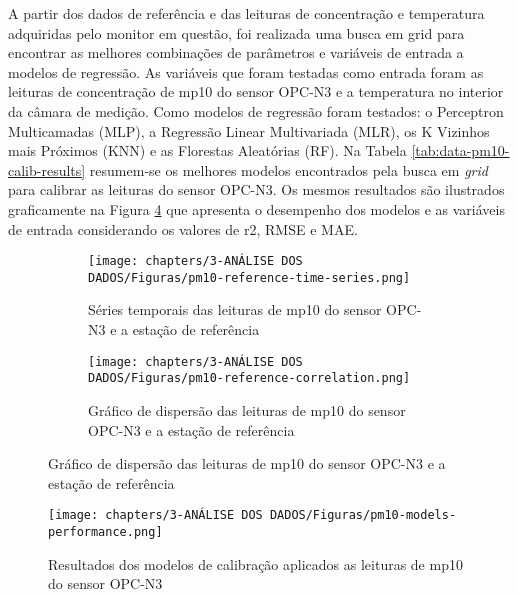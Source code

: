 A partir dos dados de referência e das leituras de concentração e temperatura adquiridas pelo monitor em questão, foi realizada uma busca em grid para encontrar as melhores combinações de parâmetros e variáveis de entrada a modelos de regressão. As variáveis que foram testadas como entrada foram as leituras de concentração de \acrshort{mp10} do sensor OPC-N3 e a temperatura no interior da câmara de medição. Como modelos de regressão foram testados: o Perceptron Multicamadas (MLP), a Regressão Linear Multivariada (MLR), os K Vizinhos mais Próximos (KNN) e as Florestas Aleatórias (RF). Na Tabela \ref{tab:data-pm10-calib-results} resumem-se os melhores modelos encontrados pela busca em \textit{grid} para calibrar as leituras do sensor OPC-N3. Os mesmos resultados são ilustrados graficamente na Figura \ref{fig:data-pm10-models-performance} que apresenta o desempenho dos modelos e as variáveis de entrada considerando os valores de r2, RMSE e MAE.

\begin{figure}[h]
    \centering
    \caption{Séries temporais e gráficos de dispersão das medições de \acrshort{mp10}}
    \begin{subfigure}{0.44\textwidth}
        \texttt{[image: chapters/3-ANÁLISE DOS DADOS/Figuras/pm10-reference-time-series.png]}
        \caption{Séries temporais das leituras de \acrshort{mp10} do sensor OPC-N3 e a estação de referência}
        \label{fig:data-pm10-reference-time-series}
    \end{subfigure}
    \hfill
    \begin{subfigure}{0.54\textwidth}
        \texttt{[image: chapters/3-ANÁLISE DOS DADOS/Figuras/pm10-reference-correlation.png]}
        \caption{Gráfico de dispersão das leituras de \acrshort{mp10} do sensor OPC-N3 e a estação de referência}
        \label{fig:data-pm10-reference-corr}
    \end{subfigure}
\end{figure}

\begin{figure}[h]
    \centering
    \caption{Resultados dos modelos de calibração aplicados as leituras de \acrshort{mp10} do sensor OPC-N3}
    \texttt{[image: chapters/3-ANÁLISE DOS DADOS/Figuras/pm10-models-performance.png]}
    \label{fig:data-pm10-models-performance}
\end{figure}

